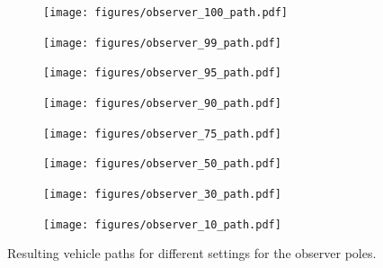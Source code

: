 \begin{figure}[h]
	\begin{subfigure}{0.24\textwidth}
		\texttt{[image: figures/observer\_100\_path.pdf]}
	\end{subfigure}
	\begin{subfigure}{0.24\textwidth}
		\texttt{[image: figures/observer\_99\_path.pdf]}
	\end{subfigure}
	\begin{subfigure}{0.24\textwidth}
		\texttt{[image: figures/observer\_95\_path.pdf]}
	\end{subfigure}
	\begin{subfigure}{0.24\textwidth}
		\centering
		\texttt{[image: figures/observer\_90\_path.pdf]}
	\end{subfigure}
	\begin{subfigure}{0.24\textwidth}
		\texttt{[image: figures/observer\_75\_path.pdf]}
	\end{subfigure}
	\begin{subfigure}{0.24\textwidth}
		\centering
		\texttt{[image: figures/observer\_50\_path.pdf]}
	\end{subfigure}
	\begin{subfigure}{0.24\textwidth}
		\texttt{[image: figures/observer\_30\_path.pdf]}
	\end{subfigure}
	\begin{subfigure}{0.24\textwidth}
		\centering
		\texttt{[image: figures/observer\_10\_path.pdf]}
	\end{subfigure}
	\caption{Resulting vehicle paths for different settings for the observer poles.}
	\label{fig:observer_result_paths}
\end{figure}


